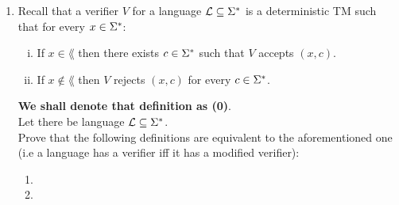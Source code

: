\documentclass{article}
\begin{document}
\begin{enumerate}
          \pagebreak

    \item Recall that a verifier $V$ for a language $\mathcal{L} \subseteq \Sigma^*$ is a deterministic TM such
          that for every $x \in \Sigma^*$:
          \begin{enumerate}[(i)]
              \item If $x \in \lang$ then there exists $c \in \Sigma^*$ such that $V$ accepts $(x, c)$.
              \item If $x \notin \lang$ then $V$ rejects $(x, c)$ for every $c \in \Sigma^*$.
          \end{enumerate}
          \textbf{We shall denote that definition as (0)}.  \\
          Let there be language $\mathcal{L} \subseteq \Sigma^*$. \\
          Prove that the following definitions are equivalent to the aforementioned one
          (i.e a language has a verifier iff it has a modified verifier):

          \begin{enumerate}
              \item 
              \item 
          \end{enumerate}

\end{enumerate}
\end{document}
